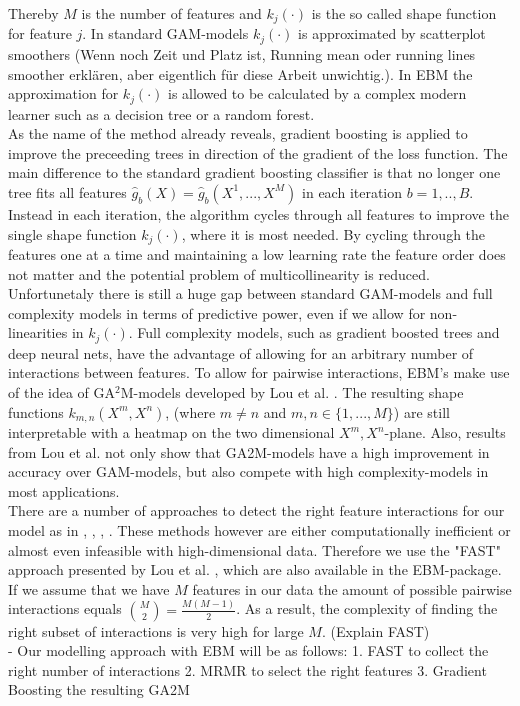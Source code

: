 \documentclass[12pt,titlepage]{article}
\begin{document}
Thereby $M$ is the number of features and $k_{j}(\cdot)$ is the so called shape function for feature $j$. In standard GAM-models $k_{j}(\cdot)$ is approximated by scatterplot smoothers (Wenn noch Zeit und Platz ist, Running mean oder running lines smoother erklären, aber eigentlich für diese Arbeit unwichtig.). In EBM the approximation for $k_{j}(\cdot)$ is allowed to be calculated by a complex modern learner such as a decision tree or a random forest. \\
As the name of the method already reveals, gradient boosting is applied to improve the preceeding trees in direction of the gradient of the loss function. The main difference to the standard gradient boosting classifier is that no longer one tree fits all features $\hat{g}_{b}(X)=\hat{g}_{b}(X^{1}, ..., X^{M})$ in each iteration $b=1,..,B$. Instead in each iteration, the algorithm cycles through all features to improve the single shape function $k_{j}(\cdot)$, where it is most needed. By cycling through the features one at a time and maintaining a low learning rate the feature order does not matter and the potential problem of multicollinearity is reduced. \\
Unfortunetaly there is still a huge gap between standard GAM-models and full complexity models in terms of predictive power, even if we allow for non-linearities in $k_{j}(\cdot)$. Full complexity models, such as gradient boosted trees and deep neural nets, have the advantage of allowing for an arbitrary number of interactions between features. To allow for pairwise interactions, EBM's make use of the idea of GA$^{2}$M-models developed by Lou et al. \cite{ga2m}. The resulting shape functions $k_{m,n}(X^{m}, X^{n})$, (where $m\neq n$ and $m,n \in \{1,...,M\}$) are still interpretable with a heatmap on the two dimensional $X^{m}, X^{n}$-plane. Also, results from Lou et al. not only show that GA2M-models have a high improvement in accuracy over GAM-models, but also compete with high complexity-models in most applications. \\
There are a number of approaches to detect the right feature interactions for our model as in \cite{anova_interaction}, \cite{pdf_interaction}, \cite{guide}, \cite{grove}. These methods however are either computationally inefficient or almost even infeasible with high-dimensional data. Therefore we use the "FAST" approach presented by Lou et al. \cite{ga2m}, which are also available in the EBM-package. \\
If we assume that we have $M$ features in our data the amount of possible pairwise interactions equals $\binom{M}{2} = \frac{M(M-1)}{2}$. As a result, the complexity of finding the right subset of interactions is very high for large $M$. (Explain FAST) \\
- Our modelling approach with EBM will be as follows: 1. FAST to collect the right number of interactions 2. MRMR to select the right features 3. Gradient Boosting the resulting GA2M
\end{document}
